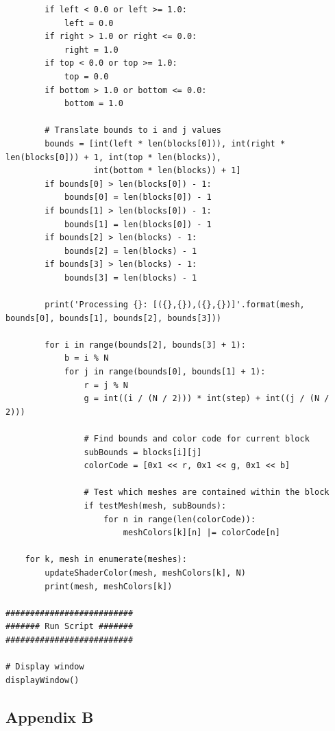 \documentclass[conference]{IEEEtran}
\begin{document}
{\begin{verbatim}
        if left < 0.0 or left >= 1.0:
            left = 0.0
        if right > 1.0 or right <= 0.0:
            right = 1.0
        if top < 0.0 or top >= 1.0:
            top = 0.0
        if bottom > 1.0 or bottom <= 0.0:
            bottom = 1.0
        
        # Translate bounds to i and j values
        bounds = [int(left * len(blocks[0])), int(right * len(blocks[0])) + 1, int(top * len(blocks)),
                  int(bottom * len(blocks)) + 1]
        if bounds[0] > len(blocks[0]) - 1:
            bounds[0] = len(blocks[0]) - 1
        if bounds[1] > len(blocks[0]) - 1:
            bounds[1] = len(blocks[0]) - 1
        if bounds[2] > len(blocks) - 1:
            bounds[2] = len(blocks) - 1
        if bounds[3] > len(blocks) - 1:
            bounds[3] = len(blocks) - 1
        
        print('Processing {}: [({},{}),({},{})]'.format(mesh, bounds[0], bounds[1], bounds[2], bounds[3]))
        
        for i in range(bounds[2], bounds[3] + 1):
            b = i % N
            for j in range(bounds[0], bounds[1] + 1):
                r = j % N
                g = int((i / (N / 2))) * int(step) + int((j / (N / 2)))
                
                # Find bounds and color code for current block
                subBounds = blocks[i][j]
                colorCode = [0x1 << r, 0x1 << g, 0x1 << b]
                
                # Test which meshes are contained within the block
                if testMesh(mesh, subBounds):
                    for n in range(len(colorCode)):
                        meshColors[k][n] |= colorCode[n]

    for k, mesh in enumerate(meshes):
        updateShaderColor(mesh, meshColors[k], N)
        print(mesh, meshColors[k])
    
##########################
####### Run Script #######
##########################

# Display window
displayWindow()
\end{verbatim}

\pagebreak

\begin{center}
\section*{Appendix B}
\label{app:b}
\end{center}

}
\end{document}
